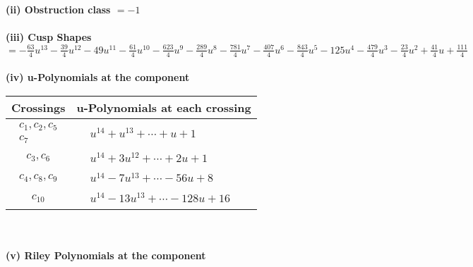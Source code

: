 \documentclass[1p]{elsarticle_modified}
\theoremstyle{definition}
\begin{document}
\flushleft \textbf{(ii) Obstruction class $= -1$}\\~\\
\flushleft \textbf{(iii) Cusp Shapes $= -\frac{63}{4} u^{13}-\frac{39}{4} u^{12}-49 u^{11}-\frac{61}{4} u^{10}-\frac{623}{4} u^9-\frac{289}{4} u^8-\frac{781}{4} u^7-\frac{407}{4} u^6-\frac{843}{4} u^5-125 u^4-\frac{479}{4} u^3-\frac{23}{4} u^2+\frac{41}{4} u+\frac{111}{4}$}\\~\\
\newpage\renewcommand{\arraystretch}{1}
\flushleft \textbf{(iv) u-Polynomials at the component}\newline \\
\begin{tabular}{m{50pt}|m{274pt}}
Crossings & \hspace{64pt}u-Polynomials at each crossing \\
\hline $$\begin{aligned}c_{1},c_{2},c_{5}\\c_{7}\end{aligned}$$&$\begin{aligned}
&u^{14}+u^{13}+\cdots+u+1
\end{aligned}$\\
\hline $$\begin{aligned}c_{3},c_{6}\end{aligned}$$&$\begin{aligned}
&u^{14}+3 u^{12}+\cdots+2 u+1
\end{aligned}$\\
\hline $$\begin{aligned}c_{4},c_{8},c_{9}\end{aligned}$$&$\begin{aligned}
&u^{14}-7 u^{13}+\cdots-56 u+8
\end{aligned}$\\
\hline $$\begin{aligned}c_{10}\end{aligned}$$&$\begin{aligned}
&u^{14}-13 u^{13}+\cdots-128 u+16
\end{aligned}$\\
\hline
\end{tabular}\\~\\
\newpage\renewcommand{\arraystretch}{1}
\flushleft \textbf{(v) Riley Polynomials at the component}\newline \\
\end{document}
